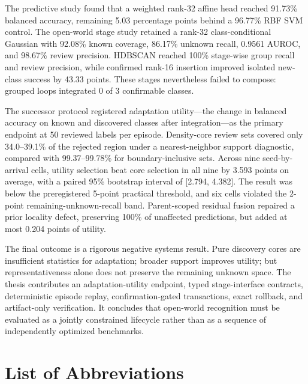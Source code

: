 \documentclass[12pt,oneside]{report}
\begin{document}
The predictive study found that a weighted rank-32 affine head reached 91.73\%
balanced accuracy, remaining 5.03 percentage points behind a 96.77\% RBF SVM
control. The open-world stage study retained a rank-32 class-conditional
Gaussian with 92.08\% known coverage, 86.17\% unknown recall, 0.9561 AUROC,
and 98.67\% review precision. HDBSCAN reached 100\% stage-wise group recall
and review precision, while confirmed rank-16 insertion improved isolated
new-class success by 43.33 points. These stages nevertheless failed to
compose: grouped loops integrated 0 of 3 confirmable classes.

The successor protocol registered adaptation utility---the change in balanced
accuracy on known and discovered classes after integration---as the primary
endpoint at 50 reviewed labels per episode. Density-core review sets covered
only 34.0--39.1\% of the rejected region under a nearest-neighbor support
diagnostic, compared with 99.37--99.78\% for boundary-inclusive sets. Across
nine seed-by-arrival cells, utility selection beat core selection in all nine
by 3.593 points on average, with a paired 95\% bootstrap interval of
[2.794, 4.382]. The result was below the preregistered 5-point practical
threshold, and six cells violated the 2-point remaining-unknown-recall band.
Parent-scoped residual fusion repaired a prior locality defect, preserving
100\% of unaffected predictions, but added at most 0.204 points of utility.

The final outcome is a rigorous negative systems result. Pure discovery cores
are insufficient statistics for adaptation; broader support improves utility;
but representativeness alone does not preserve the remaining unknown space.
The thesis contributes an adaptation-utility endpoint, typed stage-interface
contracts, deterministic episode replay, confirmation-gated transactions,
exact rollback, and artifact-only verification. It concludes that open-world
recognition must be evaluated as a jointly constrained lifecycle rather than
as a sequence of independently optimized benchmarks.

\tableofcontents
\listoftables

\chapter*{List of Abbreviations}
\end{document}
